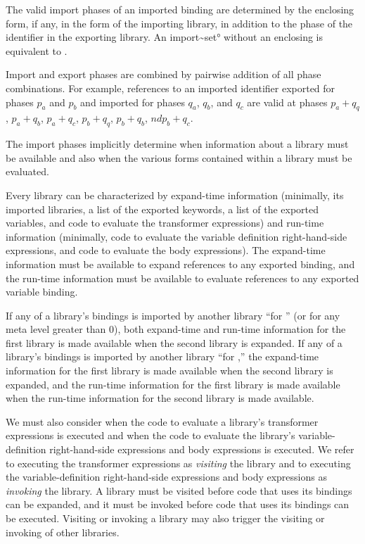 \documentclass{monograph}
\begin{document}
The valid import phases of an imported binding are determined by the enclosing
 form, if any, in the  form of the importing
library, in addition to the phase of the identifier in the exporting library.
An \ang{import~set} without an enclosing  is equivalent to
.

Import and export phases are combined by pairwise addition of all phase
combinations.  For example, references to an imported identifier exported
for phases $p_a$ and $p_b$ and imported for phases $q_a$, $q_b$, and $q_c$
are valid at phases $p_a+q_q$, $p_a+q_b$, $p_a+q_c$, $p_b+q_q$, $p_b+q_b$,
$nd p_b+q_c$.

The import phases implicitly determine when information about a
library must be available and also when the various forms contained within
a library must be evaluated.

Every library can be characterized by expand-time information (minimally,
its imported libraries, a list of the exported keywords, a list of the
exported variables, and code to evaluate the transformer expressions) and
run-time information (minimally, code to evaluate the variable definition
right-hand-side expressions, and code to evaluate the body expressions).
The expand-time information must be available to expand references to
any exported binding, and the run-time information must be available to
evaluate references to any exported variable binding.

If any of a library's bindings is imported by another library ``for
'' (or for any meta level greater than 0), both expand-time and
run-time information for the first library is made available when the second
library is expanded.
If any of a library's bindings is imported by another library ``for
,'' the expand-time information for the first library is made available when
the second library is expanded, and the run-time information for the first
library is made available when the run-time information for the second library
is made available.

We must also consider when the code to evaluate a library's transformer
expressions is executed and when the code to evaluate the library's
variable-definition right-hand-side expressions and body expressions is
executed.
We refer to executing the transformer expressions as \emph{visiting}
the library and to executing the variable-definition right-hand-side 
expressions and body expressions as \emph{invoking} the library.
A library must be visited before code that uses its bindings can be
expanded, and it must be invoked before code that uses its bindings can be
executed.
Visiting or invoking a library may also trigger the visiting or
invoking of other libraries.
\end{document}

